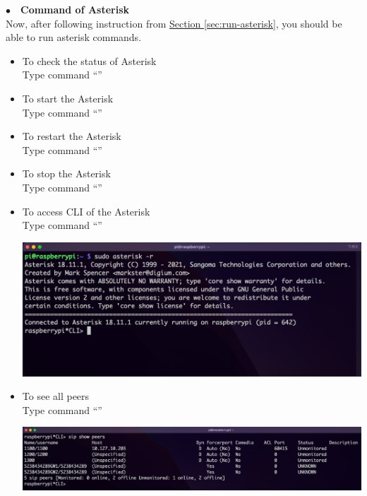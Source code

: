 \noindent$\bullet$~~\textbf{Command of Asterisk}	\label{sec:command-asterisk}\\
	Now, after following instruction from \hyperref[sec:run-asterisk]{Section \ref{sec:run-asterisk}}, you should be able to run asterisk commands.
	\begin{itemize}
		\item To check the status of Asterisk\\
		Type command ``{\selectfont{sudo service asterisk status}}''
		\item To start the Asterisk\\
		Type command ``{\selectfont{sudo service asterisk start}}''
		\item To restart the Asterisk\\
		Type command ``{\selectfont{sudo service asterisk restart}}''
		\item To stop the Asterisk\\
		Type command ``{\selectfont{sudo service asterisk stop}}''
		\item To access CLI of the Asterisk\\
		Type command ``{\selectfont{sudo asterisk -r}}''\\
			\begin{minipage}{\textwidth}
				\vspace{2mm}
				\includegraphics[scale=0.166]{Images/raspberry_pi/asterisk_install/CLI.png}
				\vspace{2mm}
			\end{minipage}
		\item To see all peers\\
		Type command ``{\selectfont{sip show peers}}''\\
			\begin{minipage}{\textwidth}
				\vspace{2mm}
				\includegraphics[scale=0.15]{Images/raspberry_pi/asterisk_install/show_peers.png}

\end{minipage}
\end{itemize}
